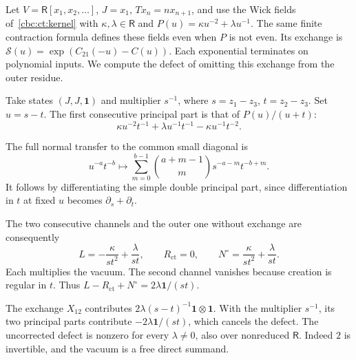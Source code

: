 \begin{example}\label{cbc:rc:omitted-exchange}
Let $V=\mathsf R[x_1,x_2,\ldots]$, $J=x_1$,
$Tx_n=nx_{n+1}$, and use the Wick fields
of~\eqref{cbc:ct:kernel} with $\kappa,\lambda\in\mathsf R$ and
$P(u)=\kappa u^{-2}+\lambda u^{-1}$.
The same finite contraction formula defines
these fields even when $P$ is not even.
Its exchange is
$\mathcal S(u)=\exp(C_{21}(-u)-C(u))$.
Each exponential terminates on polynomial
inputs. We compute the defect of omitting
this exchange from the outer residue.

Take states $(J,J,\mathbf1)$ and multiplier
$s^{-1}$, where $s=z_1-z_3$, $t=z_2-z_3$.
Set $u=s-t$. The first consecutive principal
part is that of $P(u)/(u+t)$:
\[
 \kappa u^{-2}t^{-1}+\lambda u^{-1}t^{-1}
                         -\kappa u^{-1}t^{-2}.
\]

The full normal transfer to the common small
diagonal is
\[
 u^{-a}t^{-b}\longmapsto
 \sum_{m=0}^{b-1}\binom{a+m-1}{m}s^{-a-m}t^{-b+m}.
\]
It follows by differentiating the simple
double principal part, since differentiation
in $t$ at fixed $u$ becomes $\partial_s+\partial_t$.

The two consecutive channels and the outer
one without exchange are consequently
\[
 L=-\frac\kappa{st^2}+\frac\lambda{st},
 \qquad R_{\mathrm{ct}}=0,
 \qquad N^\circ=\frac\kappa{st^2}+\frac\lambda{st}.
\]
Each multiplies the vacuum. The second channel
vanishes because creation is regular in $t$.
Thus $L-R_{\mathrm{ct}}+N^\circ=2\lambda\mathbf1/(st)$.

The exchange $X_{12}$ contributes
$2\lambda(s-t)^{-1}\mathbf1\otimes\mathbf1$.
With the multiplier $s^{-1}$, its two principal
parts contribute $-2\lambda\mathbf1/(st)$,
which cancels the defect. The uncorrected defect is nonzero for every $\lambda\ne0$,
also over nonreduced $\mathsf R$. Indeed $2$ is invertible,
and the vacuum is a free direct summand.
\end{example}

